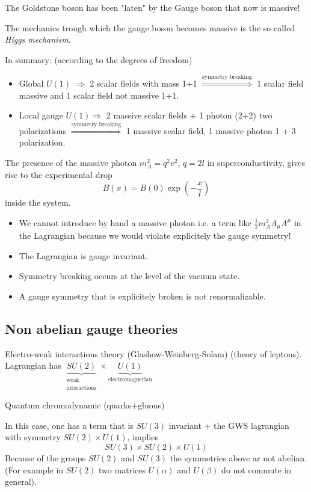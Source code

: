 \documentclass[../main/main.tex]{subfiles}
\begin{document}
The Goldstone boson has been "laten" by the Gauge boson that now is massive!

The mechanics trough which the gauge boson becomes massive is the so called \emph{Higgs mechanism}.

In summary: (according to the degrees of freedom)
\begin{itemize}
\item Global \( U(1) \)  \( \Rightarrow  \) 2 scalar fields with mass 1+1 \( \overset{\text{symmetry breaking}}{\Longrightarrow}\)  1 scalar field massive and 1 scalar field not massive 1+1.
\item Local gauge \( U(1) \)\( \Rightarrow  \) 2 massive scalar fields + 1 photon (2+2) two polarizations  \( \overset{\text{symmetry breaking}}{\Longrightarrow}  \) 1 massive scalar field, 1 massive photon 1 + 3 polarization.
\end{itemize}
\begin{remark}
The presence of the massive photon \( m^2_A = q^2 v^2 \), \( q = 2 l \) in superconductivity, gives rise to the experimental drop
\begin{equation}
  B (x) = B(0) \exp (- \frac{x}{l})
\end{equation}
inside the system.
\end{remark}
\begin{itemize}
\item We cannot introduce by hand a massive photon i.e. a term like \( \frac{1}{2} m_A^2 A_ \mu A ^\mu  \) in the Lagrangian because we would violate explicitely the gauge symmetry!

\item The Lagrangian is gauge invariant.
\item Symmetry breaking occurs at the level of the vacuum state.
\item A gauge symmetry that is explicitely broken is not renormalizable.
\end{itemize}
\subsection{Non abelian gauge theories}
\begin{example}{}{}
Electro-weak interactions theory (Glashow-Weinberg-Solam) (theory of leptons). Lagrangian has \( \underbrace{S U (2)}_{\substack{ \text{weak} \\  \text{interactions} } }  \times \underbrace{U(1)}_{\text{electromagnetian}}  \)
\end{example}
\begin{example}{Quantum chromodynamic (quarks+gluons)}{}
\end{example}
In this case, one has a term that is \( SU(3) \) invariant + the GWS lagrangian with symmetry \( SU(2) \times U(1) \), implies
\begin{equation}
  SU(3) \times SU(2) \times U(1)
\end{equation}
Because of the groups \( SU(2) \) and \( SU(3) \) the symmetries above ar not abelian.
(For example in \( SU(2) \) two matrices \( U (\alpha ) \) and \( U(\beta ) \) do not commute in general).
\end{document}
